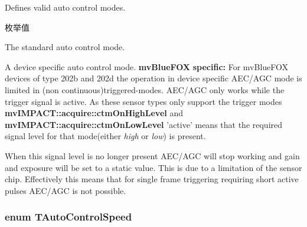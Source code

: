 Defines valid auto control modes. 

\begin{Desc}
\item[枚举值]\par
\begin{description}
\item[{\em 
\hypertarget{group___device_specific_interface_ggaa686f613e70c03c31a58674a71fb318da8896fa480711373e0e1963c1db2379de}{acm\+Standard}\label{group___device_specific_interface_ggaa686f613e70c03c31a58674a71fb318da8896fa480711373e0e1963c1db2379de}
}]The standard auto control mode. \item[{\em 
\hypertarget{group___device_specific_interface_ggaa686f613e70c03c31a58674a71fb318dae3e251193256552950ea0f3d49c38c21}{acm\+Device\+Specific}\label{group___device_specific_interface_ggaa686f613e70c03c31a58674a71fb318dae3e251193256552950ea0f3d49c38c21}
}]A device specific auto control mode. {\bfseries mv\+Blue\+F\+O\+X} {\bfseries specific\+:} For mv\+Blue\+F\+O\+X devices of type 202b and 202d the operation in device specific A\+E\+C/\+A\+G\+C mode is limited in (non continuous)triggered-\/modes. A\+E\+C/\+A\+G\+C only works while the trigger signal is active. As these sensor types only support the trigger modes {\bfseries mv\+I\+M\+P\+A\+C\+T\+::acquire\+::ctm\+On\+High\+Level} and {\bfseries mv\+I\+M\+P\+A\+C\+T\+::acquire\+::ctm\+On\+Low\+Level} 'active' means that the required signal level for that mode(either {\itshape high} or {\itshape low}) is present.

When this signal level is no longer present A\+E\+C/\+A\+G\+C will stop working and gain and exposure will be set to a static value. This is due to a limitation of the sensor chip. Effectively this means that for single frame triggering requiring short active pulses A\+E\+C/\+A\+G\+C is not possible. \end{description}
\end{Desc}
\hypertarget{group___device_specific_interface_ga363635dbd1401b0d852e9918eba2187f}{
\subsubsection[{T\+Auto\+Control\+Speed}]{\setlength{\rightskip}{0pt plus 5cm}enum {\bf T\+Auto\+Control\+Speed}}}\label{group___device_specific_interface_ga363635dbd1401b0d852e9918eba2187f}


